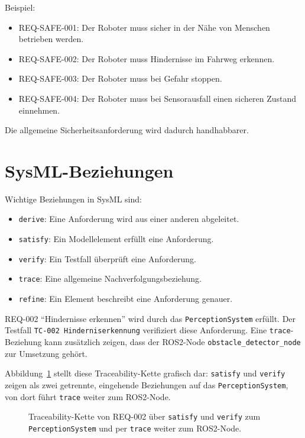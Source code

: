 Beispiel:

\begin{itemize}
    \item REQ-SAFE-001: Der Roboter muss sicher in der Nähe von Menschen betrieben werden.
    \item REQ-SAFE-002: Der Roboter muss Hindernisse im Fahrweg erkennen.
    \item REQ-SAFE-003: Der Roboter muss bei Gefahr stoppen.
    \item REQ-SAFE-004: Der Roboter muss bei Sensorausfall einen sicheren Zustand einnehmen.
\end{itemize}

Die allgemeine Sicherheitsanforderung wird dadurch handhabbarer.

\section{SysML-Beziehungen}
Wichtige Beziehungen in SysML sind:

\begin{itemize}
    \item \texttt{derive}: Eine Anforderung wird aus einer anderen abgeleitet.
    \item \texttt{satisfy}: Ein Modellelement erfüllt eine Anforderung.
    \item \texttt{verify}: Ein Testfall überprüft eine Anforderung.
    \item \texttt{trace}: Eine allgemeine Nachverfolgungsbeziehung.
    \item \texttt{refine}: Ein Element beschreibt eine Anforderung genauer.
\end{itemize}

\begin{praxisbox}
REQ-002 \enquote{Hindernisse erkennen} wird durch das \texttt{PerceptionSystem} erfüllt. Der Testfall \texttt{TC-002 Hinderniserkennung} verifiziert diese Anforderung. Eine \texttt{trace}-Beziehung kann zusätzlich zeigen, dass der ROS2-Node \texttt{obstacle\_detector\_node} zur Umsetzung gehört.
\end{praxisbox}

Abbildung~\ref{fig:kap06-traceability-req002} stellt diese Traceability-Kette grafisch dar: \texttt{satisfy} und \texttt{verify} zeigen als zwei getrennte, eingehende Beziehungen auf das \texttt{PerceptionSystem}, von dort führt \texttt{trace} weiter zum ROS2-Node.

\begin{figure}[H]
  \centering
  \caption{Traceability-Kette von REQ-002 über \texttt{satisfy} und \texttt{verify} zum \texttt{PerceptionSystem} und per \texttt{trace} weiter zum ROS2-Node.}
  \label{fig:kap06-traceability-req002}
\end{figure}

